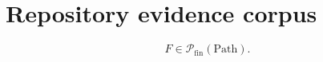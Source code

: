 \documentclass{article}
\begin{document}
\section*{Repository evidence corpus}
\label{var:repository-files}
\[
F \in \mathcal{P}_{\mathrm{fin}}(\mathrm{Path}).
\]
\end{document}
